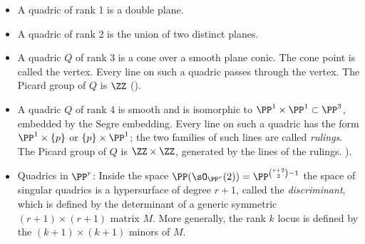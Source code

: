 \begin{itemize}
\item A quadric of rank 1 is a double plane.
\item A quadric of rank 2 is the union of two distinct planes. 
\item A quadric $Q$ of rank 3 is a cone over a smooth plane conic. The cone point is called the vertex. Every line
on such a quadric passes through the vertex. The Picard group of $Q$ is $\ZZ$
(\cite[Exercise II.6.5]{Hartshorne1977}).
\item A quadric $Q$ of rank 4 is smooth and is isomorphic to $\PP^{1}\times \PP^{1} \subset \PP^{3}$, embedded by the Segre embedding. Every line on such a quadric has the form $\PP^{1}\times \{p\}$ or $\{p\} \times \PP^{1}$; the two families of such lines are called \emph{rulings}.
The Picard group of $Q$ is $\ZZ\times \ZZ$, generated by the lines of the rulings.
\cite[Example II.6.1]{Hartshorne1977}).

\item Quadrics in $\PP^{r}$: Inside the space $\PP(\sO_{\PP^{r}}(2)) = \PP^{\binom{r+2}{2}-1}$ the space
of singular quadrics is a hypersurface of degree $r+1$, called the \emph{discriminant}, which is defined by the determinant of a generic symmetric
$(r+1)\times (r+1)$ matrix $M$. More generally, the rank $k$ locus is defined by the $(k+1)\times (k+1)$
minors of $M$.
\end{itemize}

